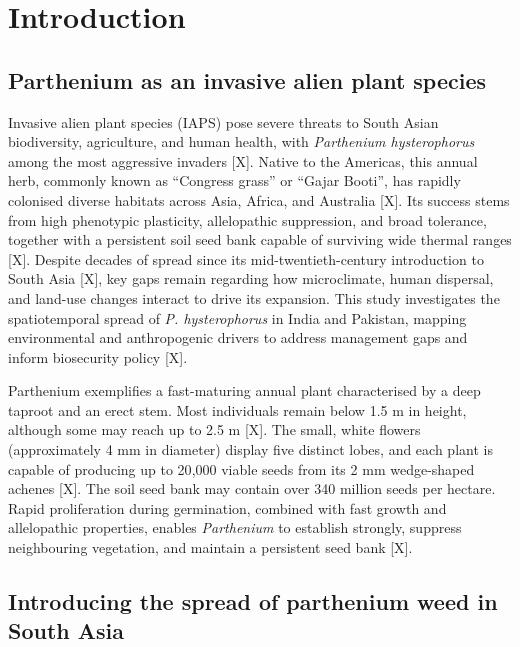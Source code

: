\chapter{Introduction}

\section{Parthenium as an invasive alien plant species}

Invasive alien plant species (IAPS) pose severe threats to South Asian biodiversity, agriculture, and human health, with \textit{Parthenium hysterophorus} among the most aggressive invaders [X]. Native to the Americas, this annual herb, commonly known as ``Congress grass'' or ``Gajar Booti'', has rapidly colonised diverse habitats across Asia, Africa, and Australia [X]. Its success stems from high phenotypic plasticity, allelopathic suppression, and broad tolerance, together with a persistent soil seed bank capable of surviving wide thermal ranges [X]. Despite decades of spread since its mid-twentieth-century introduction to South Asia [X], key gaps remain regarding how microclimate, human dispersal, and land-use changes interact to drive its expansion. This study investigates the spatiotemporal spread of \textit{P. hysterophorus} in India and Pakistan, mapping environmental and anthropogenic drivers to address management gaps and inform biosecurity policy [X].

Parthenium exemplifies a fast-maturing annual plant characterised by a deep taproot and an erect stem. Most individuals remain below 1.5 m in height, although some may reach up to 2.5 m [X]. The small, white flowers (approximately 4 mm in diameter) display five distinct lobes, and each plant is capable of producing up to 20{,}000 viable seeds from its 2 mm wedge-shaped achenes [X]. The soil seed bank may contain over 340 million seeds per hectare. Rapid proliferation during germination, combined with fast growth and allelopathic properties, enables \textit{Parthenium} to establish strongly, suppress neighbouring vegetation, and maintain a persistent seed bank [X].

\section{Introducing the spread of parthenium weed in South Asia}

